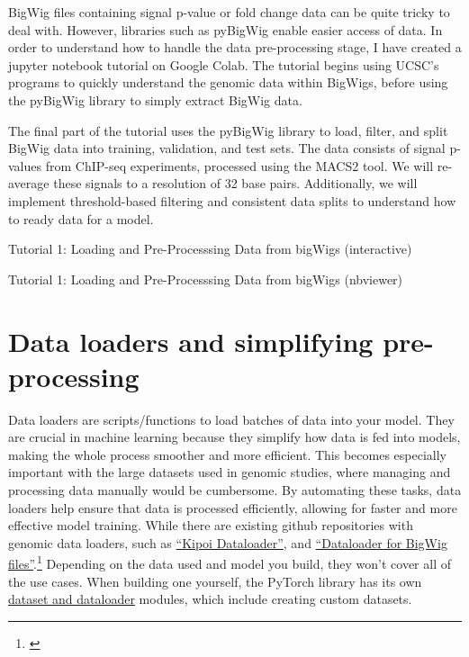 \documentclass[
]{book}
\begin{document}
BigWig files containing signal p-value or fold change data can be quite tricky to deal with. However, libraries such as pyBigWig enable easier access of data. In order to understand how to handle the data pre-processing stage, I have created a jupyter notebook tutorial on Google Colab. The tutorial begins using UCSC's programs to quickly understand the genomic data within BigWigs, before using the pyBigWig library to simply extract BigWig data.

The final part of the tutorial uses the pyBigWig library to load, filter, and split BigWig data into training, validation, and test sets. The data consists of signal p-values from ChIP-seq experiments, processed using the MACS2 tool. We will re-average these signals to a resolution of 32 base pairs. Additionally, we will implement threshold-based filtering and consistent data splits to understand how to ready data for a model.

Tutorial 1: Loading and Pre-Processsing Data from bigWigs (interactive)

Tutorial 1: Loading and Pre-Processsing Data from bigWigs (nbviewer)

\section{Data loaders and simplifying pre-processing}\label{data-loaders-and-simplifying-pre-processing}

Data loaders are scripts/functions to load batches of data into your model. They are crucial in machine learning because they simplify how data is fed into models, making the whole process smoother and more efficient. This becomes especially important with the large datasets used in genomic studies, where managing and processing data manually would be cumbersome. By automating these tasks, data loaders help ensure that data is processed efficiently, allowing for faster and more effective model training. While there are existing github repositories with genomic data loaders, such as \href{https://kipoi.org/kipoiseq/dataloaders/}{``Kipoi Dataloader''}, and \href{https://github.com/pfizer-opensource/bigwig-loader/blob/main/README.md}{``Dataloader for BigWig files''}.\footnote{\citet{retel_fast_2024}} Depending on the data used and model you build, they won't cover all of the use cases. When building one yourself, the PyTorch library has its own \href{https://pytorch.org/tutorials/beginner/basics/data_tutorial.html}{dataset and dataloader} modules, which include creating custom datasets.
\end{document}
